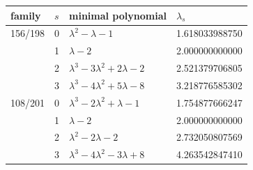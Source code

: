 \begin{tabular}{llll}
\toprule
family & $s$ & minimal polynomial & $\lambda_s$ \\
\midrule
156/198 & 0 & $\lambda^2-\lambda-1$ & 1.618033988750 \\
 & 1 & $\lambda-2$ & 2.000000000000 \\
 & 2 & $\lambda^3-3\lambda^2+2\lambda-2$ & 2.521379706805 \\
 & 3 & $\lambda^3-4\lambda^2+5\lambda-8$ & 3.218776585302 \\
108/201 & 0 & $\lambda^3-2\lambda^2+\lambda-1$ & 1.754877666247 \\
 & 1 & $\lambda-2$ & 2.000000000000 \\
 & 2 & $\lambda^2-2\lambda-2$ & 2.732050807569 \\
 & 3 & $\lambda^3-4\lambda^2-3\lambda+8$ & 4.263542847410 \\
\bottomrule
\end{tabular}
